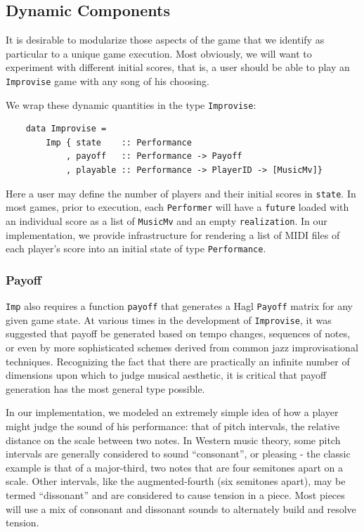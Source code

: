 \documentclass{article}
\begin{document}
\subsection{Dynamic Components}

It is desirable to modularize those aspects of the game that we identify
as particular to a unique game execution. Most obviously, we will want
to experiment with different initial scores, that is, a user should be
able to play an \texttt{Improvise} game with any song of his choosing.

We wrap these dynamic quantities in the type \texttt{Improvise}:

\begin{verbatim}
    data Improvise = 
        Imp { state    :: Performance
            , payoff   :: Performance -> Payoff
            , playable :: Performance -> PlayerID -> [MusicMv]}
\end{verbatim}

Here a user may define the number of players and their initial scores in
\texttt{state}. In most games, prior to execution, each
\texttt{Performer} will have a \texttt{future} loaded with an individual
score as a list of \texttt{MusicMv} and an empty \texttt{realization}.
In our implementation, we provide infrastructure for rendering a list of
MIDI files of each player's score into an initial state of type
\texttt{Performance}.

\subsubsection{Payoff}
\texttt{Imp} also requires a function \texttt{payoff} that generates a 
Hagl \texttt{Payoff} matrix for any given game state.  At various times in the development of
\texttt{Improvise}, it was suggested that payoff be generated based on tempo
changes, sequences of notes, or even by more sophisticated schemes
derived from common jazz improvisational techniques. Recognizing the
fact that there are practically an infinite number of dimensions upon which to
judge musical aesthetic, it is critical that payoff generation has the
most general type possible.

In our implementation, we modeled an extremely simple idea of how a
player might judge the sound of his performance: that of pitch
intervals, the relative distance on the scale between two notes. In
Western music theory, some pitch intervals are generally considered to
sound ``consonant'', or pleasing - the classic example is that of a
major-third, two notes that are four semitones apart on a scale. Other
intervals, like the augmented-fourth (six semitones apart), may be
termed ``dissonant'' and are considered to cause tension in a piece.
Most pieces will use a mix of consonant and dissonant sounds to
alternately build and resolve tension.
\end{document}
